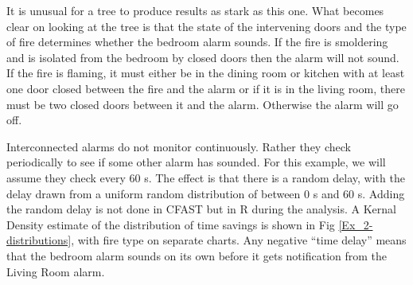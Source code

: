 \documentclass[12pt,twoside]{book}
\begin{document}
It is unusual for a tree to produce results as stark as this one. What becomes clear on looking at the tree is that the state of the intervening doors and the type of fire determines whether the bedroom alarm sounds. If the fire is smoldering and is isolated from the bedroom by closed doors then the alarm will not sound. If the fire is flaming, it must either be in the dining room or kitchen with at least one door closed between the fire and the alarm or if it is in the living room, there must be two closed doors between it and the alarm. Otherwise the alarm will go off.

Interconnected alarms do not monitor continuously. Rather they check periodically to see if some other alarm has sounded. For this example, we will assume they check every 60 s. The effect is that there is a random delay, with the delay drawn from a uniform random distribution of between 0 s and 60 s. Adding the random delay is not done in CFAST but in R during the analysis. A Kernal Density estimate of the distribution of time savings is shown in Fig \ref{Ex_2-distributions}, with fire type on separate charts. Any negative ``time delay'' means that the bedroom alarm sounds on its own before it gets notification from the Living Room alarm.
\end{document}
